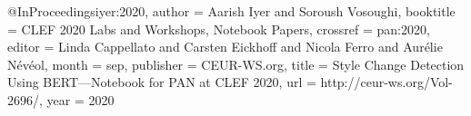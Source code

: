 @InProceedings{iyer:2020,
	author =              {Aarish Iyer and Soroush Vosoughi},
	booktitle =           {{CLEF 2020 Labs and Workshops, Notebook Papers}},
	crossref =            {pan:2020},
	editor =              {Linda Cappellato and Carsten Eickhoff and Nicola Ferro and Aur{\'e}lie N{\'e}v{\'e}ol},
	month =               sep,
	publisher =           {CEUR-WS.org},
	title =               {{Style Change Detection Using BERT---Notebook for PAN at CLEF 2020}},
	url =                 {http://ceur-ws.org/Vol-2696/},
	year =                2020
}
